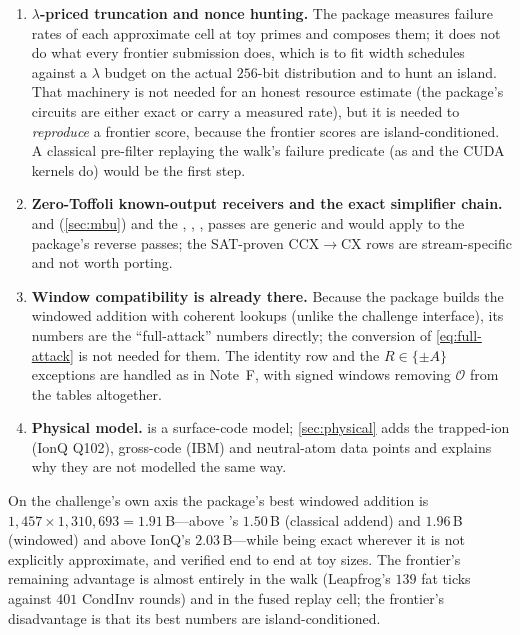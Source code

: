 \begin{enumerate}[leftmargin=*]
\item \textbf{$\lambda$-priced truncation and nonce hunting.} The package measures failure rates of each approximate cell at toy primes and composes them; it does not do what every frontier submission does, which is to fit width schedules against a $\lambda$ budget on the actual $256$-bit distribution and to hunt an island. That machinery is not needed for an honest resource estimate (the package's circuits are either exact or carry a measured rate), but it is needed to \emph{reproduce} a frontier score, because the frontier scores are island-conditioned. A classical pre-filter replaying the walk's failure predicate (as  and the CUDA kernels do) would be the first step.
\item \textbf{Zero-Toffoli known-output receivers and the exact simplifier chain.}  and  (\cref{sec:mbu}) and the , , ,  passes are generic and would apply to the package's reverse passes; the SAT-proven CCX$\to$CX rows are stream-specific and not worth porting.
\item \textbf{Window compatibility is already there.} Because the package builds the windowed addition with coherent lookups (unlike the challenge interface), its numbers are the ``full-attack'' numbers directly; the conversion of \cref{eq:full-attack} is not needed for them. The identity row and the $R\in\{\pm A\}$ exceptions are handled as in Note~F, with signed windows removing $\mathcal O$ from the tables altogether.
\item \textbf{Physical model.}  is a surface-code model; \cref{sec:physical} adds the trapped-ion (IonQ Q102), gross-code (IBM) and neutral-atom data points and explains why they are not modelled the same way.
\end{enumerate}

\begin{keybox}[title={The one-line comparison}]
On the challenge's own axis the package's best windowed addition is $1{,}457\times1{,}310{,}693=1.91$\,B---above \ecdsafail{}'s $1.50$\,B (classical addend) and $1.96$\,B (windowed) and above IonQ's $2.03$\,B---while being exact wherever it is not explicitly approximate, and verified end to end at toy sizes. The frontier's remaining advantage is almost entirely in the walk (Leapfrog's $139$ fat ticks against $401$ CondInv rounds) and in the fused replay cell; the frontier's disadvantage is that its best numbers are island-conditioned.
\end{keybox}
